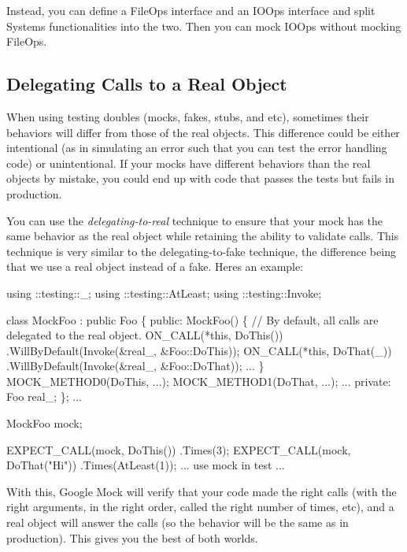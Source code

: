 Instead, you can define a {\ttfamily File\+Ops} interface and an {\ttfamily I\+O\+Ops} interface and split {\ttfamily System}\textquotesingle{}s functionalities into the two. Then you can mock {\ttfamily I\+O\+Ops} without mocking {\ttfamily File\+Ops}.

\subsection*{Delegating Calls to a Real Object}

When using testing doubles (mocks, fakes, stubs, and etc), sometimes their behaviors will differ from those of the real objects. This difference could be either intentional (as in simulating an error such that you can test the error handling code) or unintentional. If your mocks have different behaviors than the real objects by mistake, you could end up with code that passes the tests but fails in production.

You can use the {\itshape delegating-\/to-\/real} technique to ensure that your mock has the same behavior as the real object while retaining the ability to validate calls. This technique is very similar to the delegating-\/to-\/fake technique, the difference being that we use a real object instead of a fake. Here\textquotesingle{}s an example\+:


\begin{DoxyCode}
using ::testing::\_;
using ::testing::AtLeast;
using ::testing::Invoke;

\textcolor{keyword}{class }MockFoo : \textcolor{keyword}{public} Foo \{
 \textcolor{keyword}{public}:
  MockFoo() \{
    \textcolor{comment}{// By default, all calls are delegated to the real object.}
    ON\_CALL(*\textcolor{keyword}{this}, DoThis())
        .WillByDefault(Invoke(&real\_, &Foo::DoThis));
    ON\_CALL(*\textcolor{keyword}{this}, DoThat(\_))
        .WillByDefault(Invoke(&real\_, &Foo::DoThat));
    ...
  \}
  MOCK\_METHOD0(DoThis, ...);
  MOCK\_METHOD1(DoThat, ...);
  ...
 \textcolor{keyword}{private}:
  Foo real\_;
\};
...

  MockFoo mock;

  EXPECT\_CALL(mock, DoThis())
      .Times(3);
  EXPECT\_CALL(mock, DoThat(\textcolor{stringliteral}{"Hi"}))
      .Times(AtLeast(1));
  ... use mock in test ...
\end{DoxyCode}


With this, Google Mock will verify that your code made the right calls (with the right arguments, in the right order, called the right number of times, etc), and a real object will answer the calls (so the behavior will be the same as in production). This gives you the best of both worlds.

